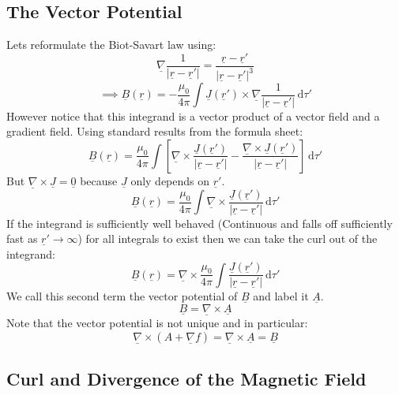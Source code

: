 \documentclass[12pt]{article}
\newcommand{\grad}[1]{\underline{\nabla}#1}
\newcommand{\curl}[1]{\underline{\nabla}\times \underline{#1}}
\begin{document}
\subsection{The Vector Potential}
Lets reformulate the Biot-Savart law using:
\[\underline{\nabla}\frac{1}{|\underline{r}-\underline{r}'|}=\frac{\underline{r}-\underline{r}'}{|\underline{r}-\underline{r}'|^3}\]
\[\implies \underline{B}(\underline{r})=-\frac{\mu_0}{4\pi}\int \underline{J}(\underline{r}')\times\underline{\nabla}\frac{1}{|\underline{r}-\underline{r}'|}\,\text{d}\tau'\]
However notice that this integrand is a vector product of a vector field and a gradient field. Using standard results from the formula sheet:
\[\underline{B}(\underline{r})=\frac{\mu_0}{4\pi}\int\left[\underline{\nabla}\times\frac{\underline{J}(\underline{r}')}{|\underline{r}-\underline{r}'|}-\frac{\underline{\nabla}\times\underline{J}(\underline{r}')}{|\underline{r}-\underline{r}'|}\right]\,\text{d}\tau'\]
But \(\curl{J}=\underline{0}\) because \(\underline{J}\) only depends on \(\underline{r}'\).
\[\underline{B}(\underline{r})=\frac{\mu_0}{4\pi}\int\underline{\nabla}\times\frac{\underline{J}(\underline{r}')}{|\underline{r}-\underline{r}'|}\,\text{d}\tau'\]
If the integrand is sufficiently well behaved (Continuous and falls off sufficiently fast as \(\underline{r}'\to\infty\)) for all integrals to exist then we can take the curl out of the integrand:
\[\underline{B}(\underline{r})=\underline{\nabla}\times\frac{\mu_0}{4\pi}\int\frac{\underline{J}(\underline{r}')}{|\underline{r}-\underline{r}'|}\,\text{d}\tau'\]
We call this second term the vector potential of \(\underline{B}\) and label it \(\underline{A}\).
\[\underline{B}=\curl{A}\]
Note that the vector potential is not unique and in particular:
\[\underline{\nabla}\times(A+\grad{f})=\curl{A}=\underline{B}\]
\subsection{Curl and Divergence of the Magnetic Field}
\end{document}
